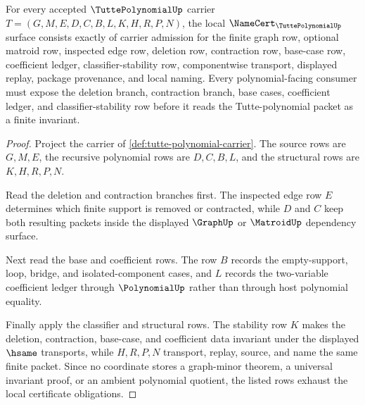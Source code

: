 \begin{theorem}
\label{thm:tutte-polynomial-deletion-contraction-obligations}
For every accepted $\TuttePolynomialUp$ carrier $T=(G,M,E,D,C,B,L,K,H,R,P,N)$, the local $\NameCert_{\TuttePolynomialUp}$ surface consists exactly of carrier admission for the finite graph row, optional matroid row, inspected edge row, deletion row, contraction row, base-case row, coefficient ledger, classifier-stability row, componentwise transport, displayed replay, package provenance, and local naming. Every polynomial-facing consumer must expose the deletion branch, contraction branch, base cases, coefficient ledger, and classifier-stability row before it reads the Tutte-polynomial packet as a finite invariant.
\end{theorem}
\begin{proof}
Project the carrier of \autoref{def:tutte-polynomial-carrier}. The source rows are $G,M,E$, the recursive polynomial rows are $D,C,B,L$, and the structural rows are $K,H,R,P,N$.

Read the deletion and contraction branches first. The inspected edge row $E$ determines which finite support is removed or contracted, while $D$ and $C$ keep both resulting packets inside the displayed $\GraphUp$ or $\MatroidUp$ dependency surface.

Next read the base and coefficient rows. The row $B$ records the empty-support, loop, bridge, and isolated-component cases, and $L$ records the two-variable coefficient ledger through $\PolynomialUp$ rather than through host polynomial equality.

Finally apply the classifier and structural rows. The stability row $K$ makes the deletion, contraction, base-case, and coefficient data invariant under the displayed $\hsame$ transports, while $H,R,P,N$ transport, replay, source, and name the same finite packet. Since no coordinate stores a graph-minor theorem, a universal invariant proof, or an ambient polynomial quotient, the listed rows exhaust the local certificate obligations.
\end{proof}


